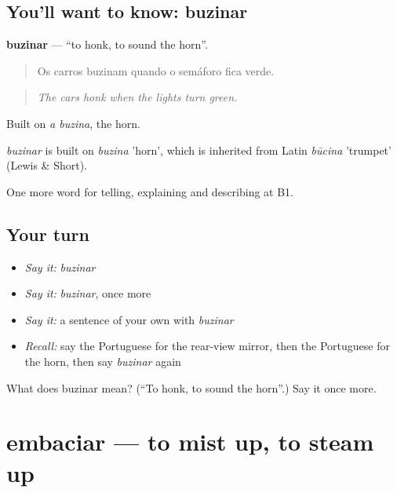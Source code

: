 \subsection*{You'll want to know: buzinar}
\textbf{buzinar} — \textquotedblleft{}to honk, to sound the horn\textquotedblright{}.

\begin{quote}
Os carros buzinam quando o semáforo fica verde.
\end{quote}

\begin{quote}
\emph{The cars honk when the lights turn green.}
\end{quote}

Built on \emph{a buzina}, the horn.

\begin{cousinweb}
\emph{buzinar} is built on \emph{buzina} 'horn', which is inherited from Latin \emph{būcina} 'trumpet' (Lewis \& Short).
\end{cousinweb}

\begin{grammarlens}[title={What you've built}]
One more word for telling, explaining and describing at B1.
\end{grammarlens}

\subsection*{Your turn}
\begin{itemize}
\raggedright
  \item \emph{Say it:} \emph{buzinar}
  \item \emph{Say it:} \emph{buzinar}, once more
  \item \emph{Say it:} a sentence of your own with \emph{buzinar}
  \item \emph{Recall:} say the Portuguese for the rear-view mirror, then the Portuguese for the horn, then say \emph{buzinar} again
\end{itemize}

\begin{tcolorbox}[breakable,colback=teal!4,colframe=teal!35!black,title={Before you move on}]
What does buzinar mean? (\textquotedblleft{}To honk, to sound the horn\textquotedblright{}.) Say it once more.
\end{tcolorbox}
\section[embaciar]{embaciar — to mist up, to steam up}

